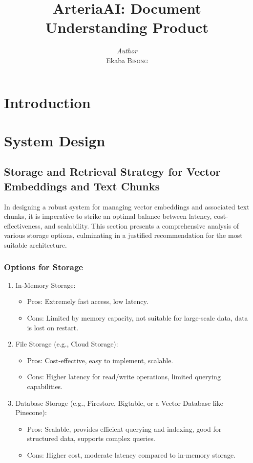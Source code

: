 \documentclass[a4paper, 12pt]{report}
\title{ArteriaAI: Document Understanding Product}
\author{\textit{Author}\\Ekaba \textsc{Bisong}}
\date{}
\begin{document}
\maketitle
\romantableofcontents



\chapter{Introduction}

\chapter{System Design}

\section{Storage and Retrieval Strategy for Vector Embeddings and Text Chunks}
In designing a robust system for managing vector embeddings and associated text chunks, it is imperative to strike an optimal balance between latency, cost-effectiveness, and scalability. This section presents a comprehensive analysis of various storage options, culminating in a justified recommendation for the most suitable architecture.

\subsection*{Options for Storage}
\begin{enumerate}
    \item In-Memory Storage:
    \begin{itemize}
        \item Pros: Extremely fast access, low latency.
        \item Cons: Limited by memory capacity, not suitable for large-scale data, data is lost on restart.
    \end{itemize}
    \item File Storage (e.g., Cloud Storage):
    \begin{itemize}
        \item Pros: Cost-effective, easy to implement, scalable.
        \item Cons: Higher latency for read/write operations, limited querying capabilities.
    \end{itemize}
    \item Database Storage (e.g., Firestore, Bigtable, or a Vector Database like Pinecone):
    \begin{itemize}
        \item Pros: Scalable, provides efficient querying and indexing, good for structured data, supports complex queries.
        \item Cons: Higher cost, moderate latency compared to in-memory storage.
    \end{itemize}
\end{enumerate}
\end{document}
